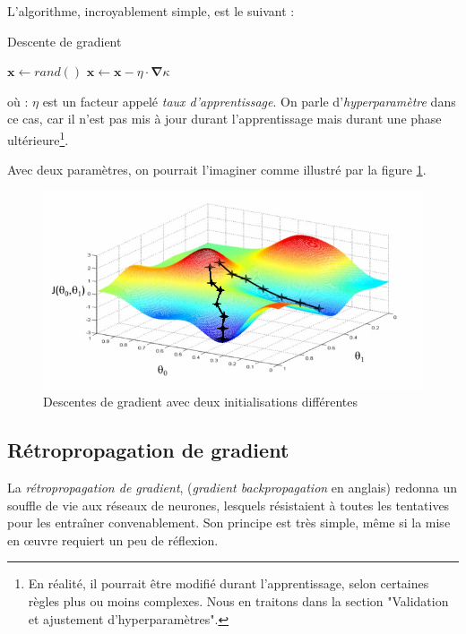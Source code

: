 L'algorithme, incroyablement simple, est le suivant :

\begin{algorithm}
\caption{Descente de gradient}
\label{alg:desc_grad}
\begin{algorithmic}
\State  \(\boldsymbol{x} \gets \mathit{rand()}\) 
\Repeat
	\State \(\boldsymbol{x} \gets \boldsymbol{x} - \eta \cdot \boldsymbol{\nabla} \kappa\)
\Until{\(\norm{\boldsymbol{\nabla} \kappa} \leq \varepsilon\)}
\end{algorithmic}
\end{algorithm}
où : \(\eta\) est un facteur appelé \emph{taux d'apprentissage}. On parle d'\emph{hyperparamètre} dans ce cas, car il n'est pas mis à jour durant l'apprentissage mais durant une phase ultérieure\footnote{En réalité, il pourrait être modifié durant l'apprentissage, selon certaines règles plus ou moins complexes. Nous en traitons dans la section "Validation et ajustement d'hyperparamètres".}.

Avec deux paramètres, on pourrait l'imaginer comme illustré par la figure \ref{fig:grad_desc}. 

\begin{figure}[H]
\centering
\includegraphics[width=\textwidth]{img/grad_desc.png}
\caption{Descentes de gradient avec deux initialisations différentes}
\label{fig:grad_desc}
\end{figure}


\subsection{Rétropropagation de gradient}
La \emph{rétropropagation de gradient}, (\emph{gradient backpropagation} en anglais) redonna un souffle de vie aux réseaux de neurones, lesquels résistaient à toutes les tentatives pour les entraîner convenablement. Son principe est très simple, même si la mise en œuvre requiert un peu de réflexion.

